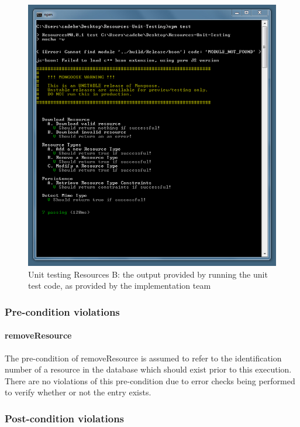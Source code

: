 \documentclass[a4paper]{article}
\begin{document}
\begin{figure}[H]
\includegraphics[width=\textwidth]{Images/test-02.jpg}
\caption{Unit testing Resources B: the output provided by running the unit test code, as provided by the implementation team \label{overflow}}
\end{figure}

\subsubsection {Pre-condition violations}

\paragraph{removeResource}
The pre-condition of removeResource is assumed to refer to the identification number of a resource in the database which should exist prior to this execution. There are no violations of this pre-condition due to error checks being performed to verify whether or not the entry exists.

\subsubsection {Post-condition violations}
\end{document}
